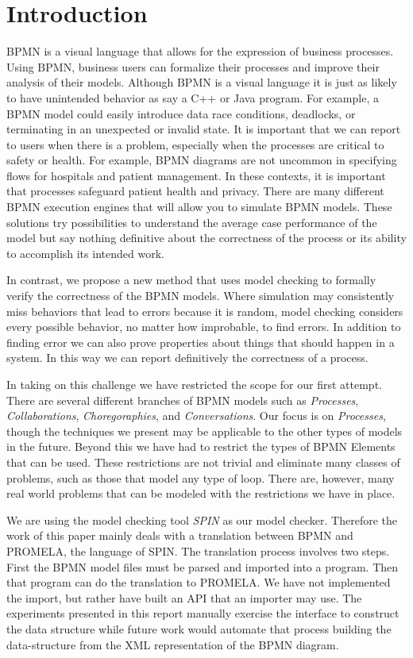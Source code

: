 \documentclass[11pt,twocolumn]{article}
\begin{document}
\section{Introduction}
BPMN is a visual language that allows for the expression of business processes. Using BPMN, business users can formalize their processes and improve their analysis of their models. Although BPMN is a visual language it is just as likely to have unintended behavior as say a C++ or Java program. For example, a BPMN model could easily introduce data race conditions, deadlocks, or terminating in an unexpected or invalid state. It is important that we can report to users when there is a problem, especially when the processes are critical to safety or health. For example, BPMN diagrams are not uncommon in specifying flows for hospitals and patient management. In these contexts, it is important that processes safeguard patient health and privacy. There are many different BPMN execution engines that will allow you to simulate BPMN models. These solutions try possibilities to understand the average case performance of the model but say nothing definitive about the correctness of the process or its ability to accomplish its intended work. 

In contrast, we propose a new method that uses model checking to formally verify the correctness of the BPMN models. Where simulation may consistently miss behaviors that lead to errors because it is random, model checking considers every possible behavior, no matter how improbable, to find errors. In addition to finding error we can also prove properties about things that should happen in a system. In this way we can report definitively the correctness of a process.

In taking on this challenge we have restricted the scope for our first attempt. There are several different branches of BPMN models such as \emph{Processes}, \emph{Collaborations}, \emph{Choregoraphies}, and \emph{Conversations}. Our focus is on \emph{Processes}, though the techniques we present may be applicable to the other types of models in the future. Beyond this we have had to restrict the types of BPMN Elements that can be used. These restrictions are not trivial and eliminate many classes of problems, such as those that model any type of loop. There are, however, many real world problems that can be modeled with the restrictions we have in place.

We are using the model checking tool \emph{SPIN} as our model checker. Therefore the work of this paper mainly deals with a translation between BPMN and PROMELA, the language of SPIN. The translation process involves two steps. First the BPMN model files must be parsed and imported into a program. Then that program can do the translation to PROMELA. We have not implemented the import, but rather have built an API that an importer may use. The experiments presented in this report manually exercise the interface to construct the data structure while future work would automate that process building the data-structure from the XML representation of the BPMN diagram. 
\end{document}
